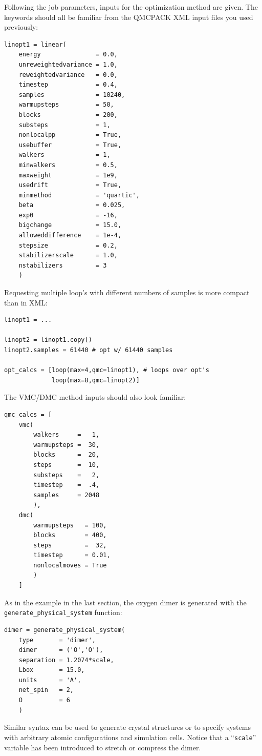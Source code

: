Following the job parameters, inputs for the optimization method are given.  The keywords should all be familiar from the QMCPACK XML input files you used previously:
\begin{lstlisting}
linopt1 = linear(
    energy               = 0.0,
    unreweightedvariance = 1.0,
    reweightedvariance   = 0.0,
    timestep             = 0.4,
    samples              = 10240, 
    warmupsteps          = 50,
    blocks               = 200,
    substeps             = 1,
    nonlocalpp           = True,
    usebuffer            = True,
    walkers              = 1,
    minwalkers           = 0.5,
    maxweight            = 1e9,
    usedrift             = True,
    minmethod            = 'quartic',
    beta                 = 0.025,
    exp0                 = -16,
    bigchange            = 15.0,
    alloweddifference    = 1e-4,
    stepsize             = 0.2,
    stabilizerscale      = 1.0,
    nstabilizers         = 3
    )
\end{lstlisting}

\noindent
Requesting multiple loop's with different numbers of samples is more compact than in XML:
\begin{lstlisting}
linopt1 = ...

linopt2 = linopt1.copy()  
linopt2.samples = 61440 # opt w/ 61440 samples

opt_calcs = [loop(max=4,qmc=linopt1), # loops over opt's
             loop(max=8,qmc=linopt2)]
\end{lstlisting}

\noindent
The VMC/DMC method inputs should also look familiar:
\begin{lstlisting}
qmc_calcs = [
    vmc(
        walkers     =   1,
        warmupsteps =  30,
        blocks      =  20,
        steps       =  10,
        substeps    =   2,
        timestep    =  .4,
        samples     = 2048
        ),
    dmc(
        warmupsteps   = 100, 
        blocks        = 400,
        steps         =  32,
        timestep      = 0.01,
        nonlocalmoves = True
        )
    ]
\end{lstlisting}
\noindent
As in the example in the last section, the oxygen dimer is generated with the \texttt{generate\_physical\_system} function:
\begin{lstlisting}
dimer = generate_physical_system(
    type       = 'dimer',
    dimer      = ('O','O'),
    separation = 1.2074*scale,
    Lbox       = 15.0,
    units      = 'A',
    net_spin   = 2,
    O          = 6
    )
\end{lstlisting}
\noindent
Similar syntax can be used to generate crystal structures or to specify systems with arbitrary atomic configurations and simulation cells.  Notice that a ``\texttt{scale}'' variable has been introduced to stretch or compress the dimer.  

